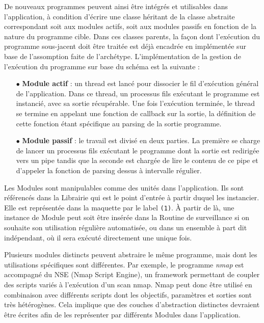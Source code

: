 \documentclass[]{article}
\begin{document}
\par De nouveaux programmes peuvent ainsi être intégrés et utilisables dans l'application, à condition d'écrire une classe héritant de la classe abstraite correspondant soit aux modules actifs, soit aux modules passifs en fonction de la nature du programme cible. Dans ces classes parents, la façon dont l'exécution du programme sous-jacent doit être traitée est déjà encadrée en implémentée sur base de l'assomption faite de l'archétype. L'implémentation de la gestion de l'exécution du programme sur base du schéma est la suivante :
\vspace{0.2cm}
\begin{itemize}
\item[$\bullet$] \textbf{Module actif} : un thread est lancé pour dissocier le fil d'exécution général de l'application. Dans ce thread, un processus fils exécutant le programme est instancié, avec sa sortie récupérable. Une fois l'exécution terminée, le thread se termine en appelant une fonction de callback sur la sortie, la définition de cette fonction étant spécifique au parsing de la sortie programme.
\vspace{0.2cm}
\item[$\bullet$] \textbf{Module passif} : le travail est divisé en deux parties. La première se charge de lancer un processus fils exécutant le programme dont la sortie est redirigée vers un pipe tandis que la seconde est chargée de lire le contenu de ce pipe et d'appeler la fonction de parsing dessus à intervalle régulier.
\end{itemize}
\vspace{0.4cm}

\par Les Modules sont manipulables comme des unités dans l'application. Ils sont référencés dans la Librairie qui est le point d'entrée à partir duquel les instancier. Elle est représentée dans la maquette par le label \texttt{(1)}. À partir de là, une instance de Module peut soit être insérée dans la Routine de surveillance si on souhaite son utilisation régulière automatisée, ou dans un ensemble à part dit indépendant, où il sera exécuté directement une unique fois.\\

\par Plusieurs modules distincts peuvent abstraire le même programme, mais dont les utilisations spécifiques sont différentes. Par exemple, le programme \textit{nmap} est accompagné du NSE (Nmap Script Engine), un framework permettant de coupler des scripts variés à l'exécution d'un scan nmap. Nmap peut donc être utilisé en combinaison avec différents scripts dont les objectifs, paramètres et sorties sont très hétérogènes. Cela implique que des couches d'abstraction distinctes devraient être écrites afin de les représenter par différents Modules dans l'application.\\
\end{document}
